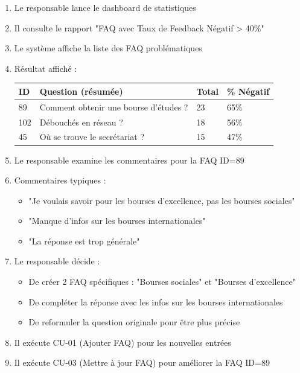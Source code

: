 \documentclass[11pt,a4paper]{article}
\begin{document}
\begin{enumerate}
    \item Le responsable lance le dashboard de statistiques
    \item Il consulte le rapport "FAQ avec Taux de Feedback Négatif > 40\%"
    \item Le système affiche la liste des FAQ problématiques
    \item Résultat affiché :
    \begin{table}[H]
    \centering
    \small
    \begin{tabular}{|l|l|l|l|}
    \hline
    \textbf{ID} & \textbf{Question (résumée)} & \textbf{Total} & \textbf{\% Négatif} \\
    \hline
    89 & Comment obtenir une bourse d'études ? & 23 & 65\% \\
    \hline
    102 & Débouchés en réseau ? & 18 & 56\% \\
    \hline
    45 & Où se trouve le secrétariat ? & 15 & 47\% \\
    \hline
    \end{tabular}
    \end{table}
    \item Le responsable examine les commentaires pour la FAQ ID=89
    \item Commentaires typiques :
    \begin{itemize}
        \item "Je voulais savoir pour les bourses d'excellence, pas les bourses sociales"
        \item "Manque d'infos sur les bourses internationales"
        \item "La réponse est trop générale"
    \end{itemize}
    \item Le responsable décide :
    \begin{itemize}
        \item De créer 2 FAQ spécifiques : "Bourses sociales" et "Bourses d'excellence"
        \item De compléter la réponse avec les infos sur les bourses internationales
        \item De reformuler la question originale pour être plus précise
    \end{itemize}
    \item Il exécute CU-01 (Ajouter FAQ) pour les nouvelles entrées
    \item Il exécute CU-03 (Mettre à jour FAQ) pour améliorer la FAQ ID=89
\end{enumerate}
\end{document}
